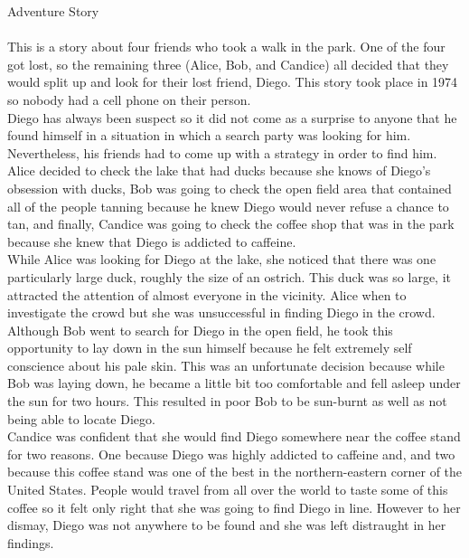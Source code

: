 \documentclass{article}
\begin{document}
\large{Adventure Story} \\ \\
This is a story about four friends who took a walk in the park. One of the four got lost, so the remaining three (Alice, Bob, and Candice) all decided that they would split up and look for their lost friend, Diego. This story took place in 1974 so nobody had a cell phone on their person.\\
Diego has always been suspect so it did not come as a surprise to anyone that he found himself in a situation in which a search party was looking for him. Nevertheless, his friends had to come up with a strategy in order to find him. Alice decided to check the lake that had ducks because she knows of Diego's obsession with ducks, Bob was going to check the open field area that contained all of the people tanning because he knew Diego would never refuse a chance to tan, and finally, Candice was going to check the coffee shop that was in the park because she knew that Diego is addicted to caffeine.\\
While Alice was looking for Diego at the lake, she noticed that there was one particularly large duck, roughly the size of an ostrich. This duck was so large, it attracted the attention of almost everyone in the vicinity. Alice when to investigate the crowd but she was unsuccessful in finding Diego in the crowd. \\
Although Bob went to search for Diego in the open field, he took this opportunity to lay down in the sun himself because he felt extremely self conscience about his pale skin. This was an unfortunate decision because while Bob was laying down, he became a little bit too comfortable and fell asleep under the sun for two hours. This resulted in poor Bob to be sun-burnt as well as not being able to locate Diego.\\
Candice was confident that she would find Diego somewhere near the coffee stand for two reasons. One because Diego was highly addicted to caffeine and, and two because this coffee stand was one of the best in the northern-eastern corner of the United States. People would travel from all over the world to taste some of this coffee so it felt only right that she was going to find Diego in line. However to her dismay, Diego was not anywhere to be found and she was left distraught in her findings.
\end{document}
